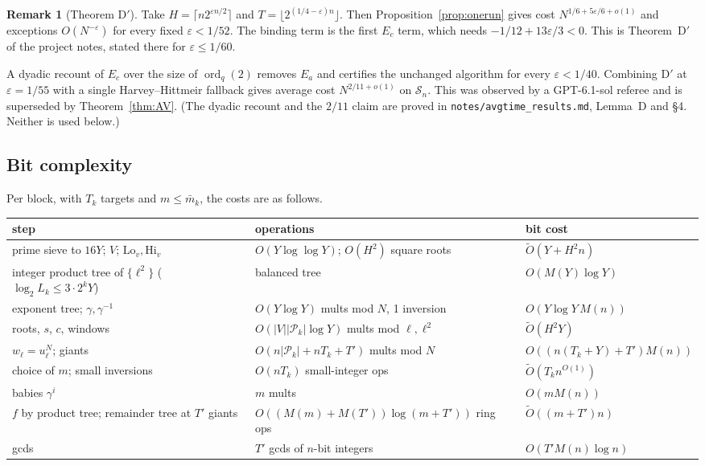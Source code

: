 \documentclass[11pt]{amsart}
\theoremstyle{definition}
\newtheorem{remark}[theorem]{Remark}
\newcommand{\Sn}{\mathcal{S}_n}
\newcommand{\Pk}{\mathcal{P}_k}
\newcommand{\ord}{\operatorname{ord}}
\newcommand{\mbar}{\bar m_k}
\begin{document}
\begin{remark}[Theorem D$'$]\label{rem:Dprime}
Take $H=\lceil n2^{\varepsilon n/2}\rceil$ and $T=\lfloor2^{(1/4-\varepsilon)n}\rfloor$. Then
Proposition~\ref{prop:onerun} gives cost $N^{1/6+5\varepsilon/6+o(1)}$ and exceptions
$O(N^{-\varepsilon})$ for every fixed $\varepsilon<1/52$. The binding term is the first $E_c$
term, which needs $-1/12+13\varepsilon/3<0$. This is Theorem~D$'$ of the project notes, stated
there for $\varepsilon\le1/60$.

A dyadic recount of $E_c$ over the size of $\ord_q(2)$ removes $E_a$ and certifies the unchanged
algorithm for every $\varepsilon<1/40$. Combining D$'$ at $\varepsilon=1/55$ with a single
Harvey--Hittmeir fallback gives average cost $N^{2/11+o(1)}$ on $\Sn$. This was observed by a
GPT-6.1-sol referee and is superseded by Theorem~\ref{thm:AV}. (The dyadic recount and the
$2/11$ claim are proved in \texttt{notes/avgtime\_results.md}, Lemma~D and \S4. Neither is used
below.)
\end{remark}

\subsection{Bit complexity}\label{sec:cost}
Per block, with $T_k$ targets and $m\le\mbar$, the costs are as follows.

\begin{center}
\small
\begin{tabular}{p{}p{}p{}}
\toprule
step & operations & bit cost\\
\midrule
prime sieve to $16Y$; $V$; $\mathrm{Lo}_v,\mathrm{Hi}_v$ & $O(Y\log\log Y)$; $O(H^2)$ square roots & $\tilde O(Y+H^2n)$\\
integer product tree of $\{\ell^2\}$ ($\log_2L_k\le3\cdot2^kY$) & balanced tree & $O(M(Y)\log Y)$\\
exponent tree; $\gamma,\gamma^{-1}$ & $O(Y\log Y)$ mults mod $N$, 1 inversion & $O(Y\log Y\,M(n))$\\
roots, $s$, $c$, windows & $O(|V||\Pk|\log Y)$ mults mod $\ell,\ell^2$ & $\tilde O(H^2Y)$\\
$w_\ell=u_\ell^N$; giants & $O(n|\Pk|+nT_k+T')$ mults mod $N$ & $O((n(T_k+Y)+T')M(n))$\\
choice of $m$; small inversions & $O(nT_k)$ small-integer ops & $\tilde O(T_kn^{O(1)})$\\
babies $\gamma^i$ & $m$ mults & $O(mM(n))$\\
$f$ by product tree; remainder tree at $T'$ giants & $O((M(m)+M(T'))\log(m+T'))$ ring ops & $\tilde O((m+T')n)$\\
gcds & $T'$ gcds of $n$-bit integers & $O(T'M(n)\log n)$\\
\bottomrule
\end{tabular}
\end{center}
\end{document}
